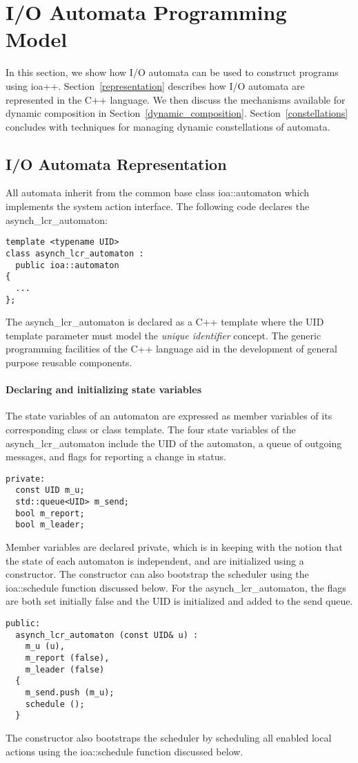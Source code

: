 \section{I/O Automata Programming Model\label{programming_model}}

In this section, we show how I/O automata can be used to construct programs using ioa++.
Section~\ref{representation} describes how I/O automata are represented in the C++ language.
We then discuss the mechanisms available for dynamic composition in Section~\ref{dynamic_composition}.
Section~\ref{constellations} concludes with techniques for managing dynamic constellations of automata.

\subsection{I/O Automata Representation\label{representation}}

All automata inherit from the common base class ioa::automaton which implements the system action interface.
\ifjournal
The following code declares the asynch\_lcr\_automaton:
\begin{lstlisting}
template <typename UID>
class asynch_lcr_automaton :
  public ioa::automaton
{
  ...
};
\end{lstlisting}
The asynch\_lcr\_automaton is declared as a C++ template where the UID template parameter must model the \emph{unique identifier} concept.
The generic programming facilities of the C++ language aid in the development of general purpose reusable components.
\fi

\paragraph*{Declaring and initializing state variables}
The state variables of an automaton are expressed as member variables of its corresponding class or class template.
\ifjournal
The four state variables of the asynch\_lcr\_automaton include the UID of the automaton, a queue of outgoing messages, and flags for reporting a change in status.
\begin{lstlisting}
private:
  const UID m_u;
  std::queue<UID> m_send;
  bool m_report;
  bool m_leader;
\end{lstlisting}
\fi
Member variables are declared private, which is in keeping with the notion that the state of each automaton is independent, and are initialized using a constructor.
The constructor can also bootstrap the scheduler using the ioa::schedule function discussed below.
\ifjournal
For the asynch\_lcr\_automaton, the flags are both set initially false and the UID is initialized and added to the send queue.
\begin{lstlisting}
public:
  asynch_lcr_automaton (const UID& u) :
    m_u (u),
    m_report (false),
    m_leader (false)
  {
    m_send.push (m_u);
    schedule ();
  }
\end{lstlisting}
The constructor also bootstraps the scheduler by scheduling all enabled local actions using the ioa::schedule function discussed below.
\fi


